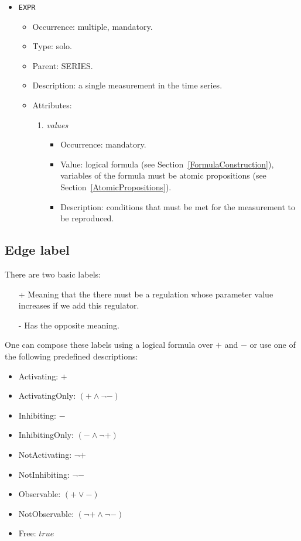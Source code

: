 \documentclass[12pt]{article}
\newenvironment{menum}{
\begin{enumerate}
  \setlength{\itemsep}{0pt}
  \setlength{\parskip}{0pt}
  \setlength{\parsep}{0pt}
}{\end{enumerate}}
\newenvironment{mitem}{
\begin{itemize}
  \setlength{\itemsep}{0pt}
  \setlength{\parskip}{0pt}
  \setlength{\parsep}{0pt}
}{\end{itemize}}
\begin{document}
\begin{mitem}
	\item \texttt{EXPR}
	\begin{mitem}
		\item Occurrence: multiple, mandatory.
		\item Type: solo.
		\item Parent: SERIES.
		\item Description: a single measurement in the time series.
		\item Attributes:	
		\begin{menum}
			\item \textit{values} 
			\begin{mitem}
				\item Occurrence: mandatory.
				\item Value: logical formula (see Section~\ref{FormulaConstruction}), variables of the formula must be atomic propositions (see Section~\ref{AtomicPropositions}).
				\item Description: conditions that must be met for the measurement to be reproduced.
			\end{mitem}
		\end{menum}
	\end{mitem}
\end{mitem}	

\subsection{Edge label}
\label{EdgeLabel}
There are two basic labels:
\begin{itemize}
\item [+]	Meaning that the there must be a regulation whose parameter value increases if we add this regulator.
\item [-]	Has the opposite meaning.
\end{itemize}
One can compose these labels using a logical formula over $+$ and $-$ or use one of the following predefined descriptions:
\begin{itemize}
\item Activating: $+$
\item ActivatingOnly: $(+ \wedge \neg -)$
\item Inhibiting: $-$
\item InhibitingOnly: $(- \wedge \neg +)$
\item NotActivating: $\neg +$
\item NotInhibiting: $\neg -$
\item Observable: $(+ \vee -)$
\item NotObservable: $(\neg + \wedge \neg -)$
\item Free: $true$

\end{itemize}
\end{document}
